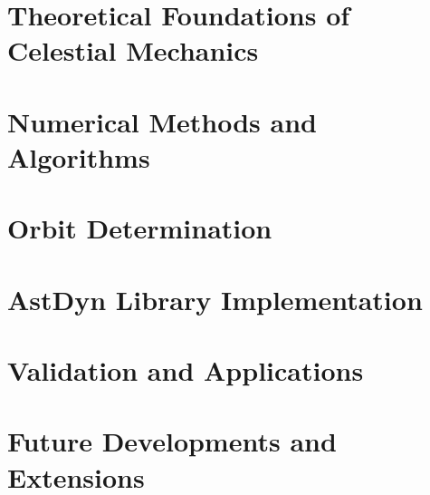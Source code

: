 \documentclass[11pt,twoside,openright]{book}
\theoremstyle{definition}
\theoremstyle{plain}
\theoremstyle{remark}
\begin{document}
\frontmatter





\tableofcontents
\listoffigures
\listoftables

\mainmatter

\part{Theoretical Foundations of Celestial Mechanics}








\part{Numerical Methods and Algorithms}





\part{Orbit Determination}





\part{AstDyn Library Implementation}







\part{Validation and Applications}






\part{Future Developments and Extensions}


\backmatter



\end{document}
